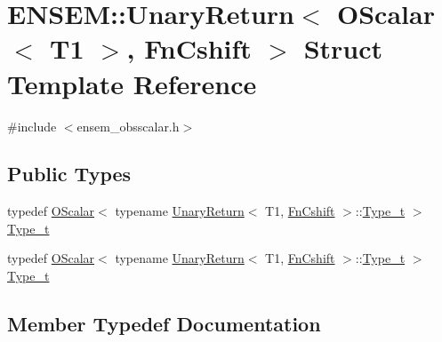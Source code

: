 \hypertarget{structENSEM_1_1UnaryReturn_3_01OScalar_3_01T1_01_4_00_01FnCshift_01_4}{}\section{E\+N\+S\+EM\+:\+:Unary\+Return$<$ O\+Scalar$<$ T1 $>$, Fn\+Cshift $>$ Struct Template Reference}
\label{structENSEM_1_1UnaryReturn_3_01OScalar_3_01T1_01_4_00_01FnCshift_01_4}


{\ttfamily \#include $<$ensem\+\_\+obsscalar.\+h$>$}

\subsection*{Public Types}
\begin{DoxyCompactItemize}
\item 
typedef \mbox{\hyperlink{classENSEM_1_1OScalar}{O\+Scalar}}$<$ typename \mbox{\hyperlink{structENSEM_1_1UnaryReturn}{Unary\+Return}}$<$ T1, \mbox{\hyperlink{structENSEM_1_1FnCshift}{Fn\+Cshift}} $>$\+::\mbox{\hyperlink{structENSEM_1_1UnaryReturn_3_01OScalar_3_01T1_01_4_00_01FnCshift_01_4_a98d26d4e3352558b80bc62389e24a27d}{Type\+\_\+t}} $>$ \mbox{\hyperlink{structENSEM_1_1UnaryReturn_3_01OScalar_3_01T1_01_4_00_01FnCshift_01_4_a98d26d4e3352558b80bc62389e24a27d}{Type\+\_\+t}}
\item 
typedef \mbox{\hyperlink{classENSEM_1_1OScalar}{O\+Scalar}}$<$ typename \mbox{\hyperlink{structENSEM_1_1UnaryReturn}{Unary\+Return}}$<$ T1, \mbox{\hyperlink{structENSEM_1_1FnCshift}{Fn\+Cshift}} $>$\+::\mbox{\hyperlink{structENSEM_1_1UnaryReturn_3_01OScalar_3_01T1_01_4_00_01FnCshift_01_4_a98d26d4e3352558b80bc62389e24a27d}{Type\+\_\+t}} $>$ \mbox{\hyperlink{structENSEM_1_1UnaryReturn_3_01OScalar_3_01T1_01_4_00_01FnCshift_01_4_a98d26d4e3352558b80bc62389e24a27d}{Type\+\_\+t}}
\end{DoxyCompactItemize}


\subsection{Member Typedef Documentation}
\mbox{\label{structENSEM_1_1UnaryReturn_3_01OScalar_3_01T1_01_4_00_01FnCshift_01_4_a98d26d4e3352558b80bc62389e24a27d}} 

